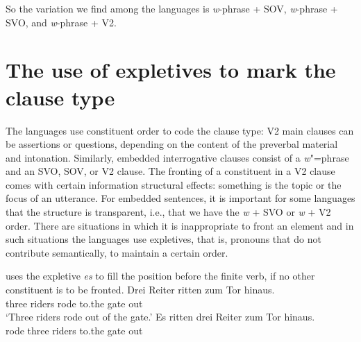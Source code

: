 So the variation we find among the  languages is \emph{w}-phrase + SOV, \emph{w}-phrase + SVO, and \emph{w}-phrase + V2.


\section{The use of expletives to mark the clause type}

The  languages use constituent order to code the clause type: V2 main clauses can be
assertions or questions, depending on the content of the preverbal material and
intonation. Similarly, embedded interrogative clauses consist of a \emph{w}"=phrase and an SVO, SOV,
or V2 clause. The fronting of a constituent in a V2 clause comes with certain information structural
effects: something is the topic or the focus of an utterance. For embedded sentences, it is important
for some languages that the structure is transparent, i.e., that we have the \emph{w} + SVO or
\emph{w} + V2 order. There are situations in which it is inappropriate to front an element and in
such situations the  languages use expletives, that is, pronouns that do not contribute
semantically, to maintain a certain order.

 uses the expletive \emph{es} to fill the position before the finite verb, if no other
constituent is to be fronted.
\eal
\ex 
\gll Drei Reiter ritten zum Tor hinaus.\\
     three riders rode  to.the gate out\\\german
\glt `Three riders rode out of the gate.'
\ex 
\gll Es ritten drei Reiter zum Tor hinaus.\\
     \expl{} rode   three riders to.the gate out\\
\zl

